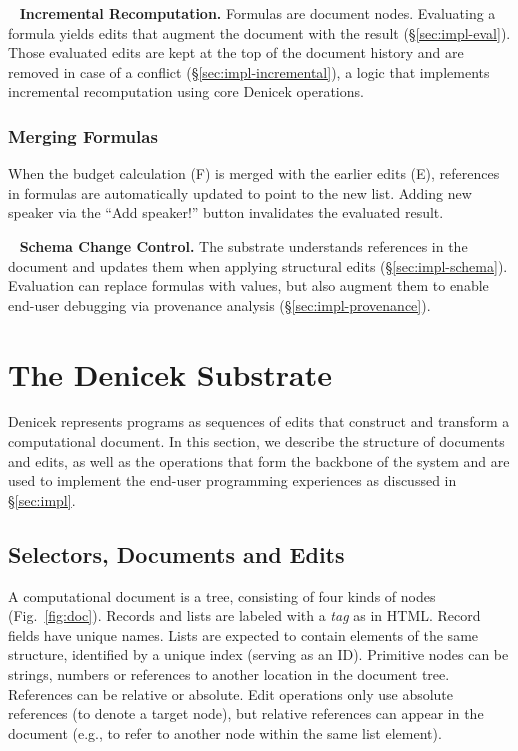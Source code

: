 \documentclass[sigconf,anonymous,screen]{acmart}
\newcommand*\circled[1]{\textnormal{\footnotesize\sffamily\bfseries\protect\tikz[baseline=(char.base)]{
  \node[shape=circle,fill=black,text=white,draw,inner sep=1pt] (char) {#1};}}}
\DeclareRobustCommand{\keyideabox}[3]{\begin{tcolorbox}[breakable,
  boxsep=5pt,left=0pt,right=0pt,top=0pt,bottom=0pt,width=\dimexpr\columnwidth\relax,
  colback=gray!20,colframe=gray!20,
  enlarge bottom by=0pt,enlarge top by=0pt,
  arc=0pt,outer arc=0pt]
\lettrine[lraise=0.3]{\LARGE #1}{~}
\small \textbf{#2.} #3
\end{tcolorbox}
}
\begin{document}
\keyideabox{\faLightbulbO}{Incremental Recomputation}{Formulas are document nodes.
Evaluating a formula yields edits that augment the document with the result
(\S\ref{sec:impl-eval}). Those evaluated edits are kept at the top of the document history and are
removed in case of a conflict (\S\ref{sec:impl-incremental}), a logic that implements
incremental recomputation using core Denicek operations.}

\subsubsection*{\circled{G} Merging Formulas} When the budget calculation (F) is merged with the
earlier edits (E), references in formulas are automatically updated to point to the new list.
Adding new speaker via the ``Add speaker!'' button invalidates the evaluated result.

\keyideabox{\faLightbulbO}{Schema Change Control}{The substrate understands references in
the document and updates them when applying structural edits (\S\ref{sec:impl-schema}).
Evaluation can replace formulas with values, but also augment them to enable
end-user debugging via provenance analysis (\S\ref{sec:impl-provenance}).}


\section{The Denicek Substrate}
\label{sec:system}
Denicek represents programs as sequences of edits that construct and transform a computational
document. In this section, we describe the structure of documents and edits, as well as the
operations that form the backbone of the system and are used to implement the
end-user programming experiences as discussed in \S\ref{sec:impl}.


\subsection{Selectors, Documents and Edits}
\label{sec:system-defs}
A computational document is a tree, consisting of four kinds of nodes (Fig.~\ref{fig:doc}).
Records and lists are labeled with a \emph{tag} as in HTML. Record fields have unique names.
Lists are expected to contain elements of the same structure, identified by a unique index (serving
as an ID). Primitive nodes can be strings, numbers or references to another location in the
document tree. References can be relative or absolute. Edit operations only use absolute
references (to denote a target node), but relative references can appear in the document (e.g., to
refer to another node within the same list element).
\end{document}
